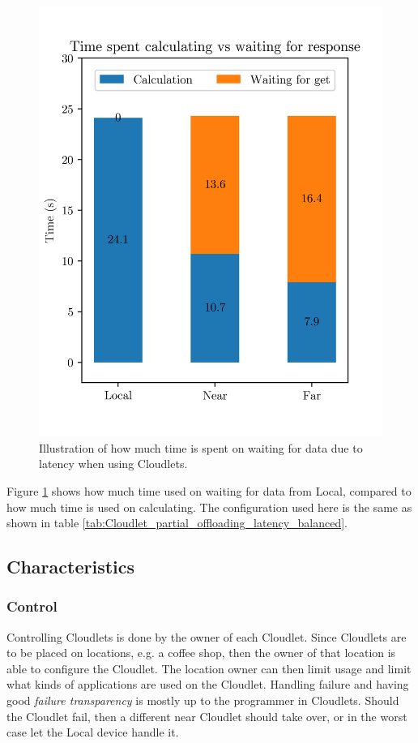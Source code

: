 \begin{figure}[t]
    \centering
    \includegraphics[scale=1]{chapters/evaluation/figures/bar_local_near_far_compare_low_interaction.png}
    \caption{Illustration of how much time is spent on waiting for data due to latency when using Cloudlets.}
    \label{fig:Cloudlet_latency_bar}
\end{figure}
Figure \ref{fig:Cloudlet_latency_bar} shows how much time used on waiting for data from Local, compared to how much time is used on calculating. The configuration used here is the same as shown in table \ref{tab:Cloudlet_partial_offloading_latency_balanced}.




\subsection{Characteristics}
\subsubsection{Control}
Controlling Cloudlets is done by the owner of each Cloudlet. Since Cloudlets are to be placed on locations, e.g. a coffee shop, then the owner of that location is able to configure the Cloudlet. The location owner can then limit usage and limit what kinds of applications are used on the Cloudlet. Handling failure and having good \textit{failure transparency} is mostly up to the programmer in Cloudlets. Should the Cloudlet fail, then a different near Cloudlet should take over, or in the worst case let the Local device handle it. 
